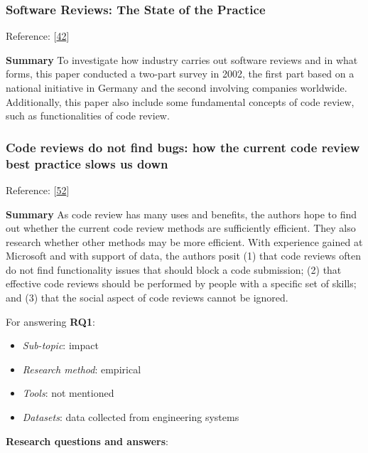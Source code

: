 \documentclass[]{book}
\providecommand{\tightlist}{%
  \setlength{\itemsep}{0pt}\setlength{\parskip}{0pt}}
\begin{document}
\subsubsection{Software Reviews: The State of the
Practice}\label{software-reviews-the-state-of-the-practice}

Reference: {[}\protect\hyperlink{ref-ciolkowski2003software}{42}{]}

\textbf{Summary} To investigate how industry carries out software
reviews and in what forms, this paper conducted a two-part survey in
2002, the first part based on a national initiative in Germany and the
second involving companies worldwide. Additionally, this paper also
include some fundamental concepts of code review, such as
functionalities of code review.

\subsubsection{Code reviews do not find bugs: how the current code
review best practice slows us
down}\label{code-reviews-do-not-find-bugs-how-the-current-code-review-best-practice-slows-us-down}

Reference: {[}\protect\hyperlink{ref-czerwonka2015code}{52}{]}

\textbf{Summary} As code review has many uses and benefits, the authors
hope to find out whether the current code review methods are
sufficiently efficient. They also research whether other methods may be
more efficient. With experience gained at Microsoft and with support of
data, the authors posit (1) that code reviews often do not find
functionality issues that should block a code submission; (2) that
effective code reviews should be performed by people with a specific set
of skills; and (3) that the social aspect of code reviews cannot be
ignored.

For answering \textbf{RQ1}:

\begin{itemize}
\tightlist
\item
  \emph{Sub-topic}: impact
\item
  \emph{Research method}: empirical
\item
  \emph{Tools}: not mentioned
\item
  \emph{Datasets}: data collected from engineering systems
\end{itemize}

\textbf{Research questions and answers}:
\end{document}
